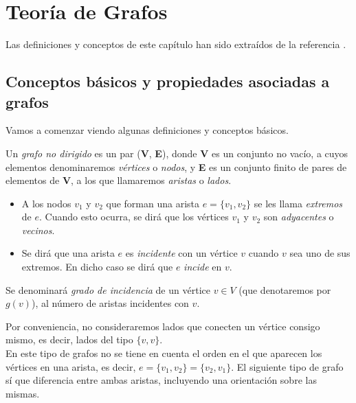 
\setchapterpreamble[c][0.75\linewidth]{%
	\sffamily
	\par\bigskip
}
\chapter{Teoría de Grafos}\label{ch:segundo-capitulo}
Las definiciones y conceptos de este capítulo han sido extraídos de la referencia \cite{algorithms}.

\section{Conceptos básicos y propiedades asociadas a grafos}
Vamos a comenzar viendo algunas definiciones y conceptos básicos.

\begin{definicion}
	Un \textit{grafo no  dirigido} es un par (\textbf{V}, \textbf{E}), donde \textbf{V} es un conjunto no vacío, a cuyos elementos denominaremos \textit{vértices} o \textit{nodos}, y \textbf{E} es un conjunto finito de pares de elementos de \textbf{V}, a los que llamaremos \textit{aristas} o \textit{lados}.
\end{definicion}

\begin{itemize}
	\item A los nodos $v_1$ y $v_2$ que forman una arista $e=\{v_1, v_2\}$ se les llama \textit{extremos} de $e$. Cuando esto ocurra, se dirá que los vértices $v_1$ y $v_2$ son \textit{adyacentes} o \textit{vecinos}.
	
	\item Se dirá que una arista $e$ es \textit{incidente} con un vértice $v$ cuando $v$ sea uno de sus extremos. En dicho caso se dirá que $e$ \textit{incide} en $v$.
\end{itemize}

\begin{definicion}
	Se denominará \textit{grado de incidencia} de un vértice $v\in V$ (que denotaremos por $g(v)$), al número de aristas incidentes con $v$.
\end{definicion}

Por conveniencia, no consideraremos lados que conecten un vértice consigo mismo, es decir, lados del tipo $\{v, v\}$. \\

En este tipo de grafos no se tiene en cuenta el orden en el que aparecen los vértices en una arista, es decir,  $e=\{v_1, v_2\}=\{v_2, v_1\}$. El siguiente tipo de grafo sí que diferencia entre ambas aristas, incluyendo una orientación sobre las mismas.


